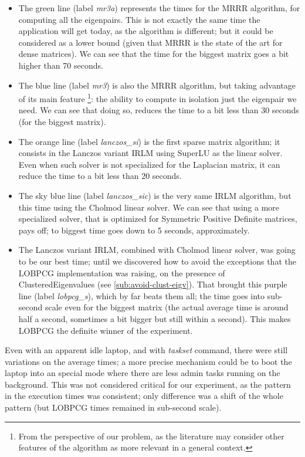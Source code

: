 \begin{itemize}
\item The green line (label \emph{mr3a}) represents the times for the
  \gls{MRRR} algorithm, for 
  computing all the eigenpairs. This is not exactly the same time
  the application will get today, as the algorithm is different; but
  it could be considered as a lower bound (given that \gls{MRRR} is the
  state of the art for dense matrices). We can see that the time for
  the biggest matrix goes a bit higher than 70 seconds.
\item The blue line (label \emph{mr3}) is also the \gls{MRRR} algorithm, but
  taking advantage of its main feature \footnote{From the perspective
    of our problem, as the literature may consider other features of
    the algorithm as more relevant in a general context.}: the
  ability to compute in 
  isolation just the eigenpair we need. We can see that doing so,
  reduces the time to a bit less than 30 seconds (for the biggest
  matrix).
\item The orange line (label \emph{lanczos\_si}) is the first sparse
  matrix algorithm; it consists in the Lanczos variant \gls{IRLM}
  using \gls{SuperLU} 
  as the linear solver. Even when such solver is not specialized for
  the \gls{Laplacian} matrix, it can reduce the time to a bit less than 20
  seconds.
  \item The sky blue line (label \emph{lanczos\_sic}) is the very same
    \gls{IRLM} algorithm, but this time using the \gls{Cholmod} linear solver. We
    can see that using a more specialized solver, that is optimized
    for Symmetric Positive Definite matrices, pays off; to biggest
    time goes down to 5 seconds, approximately.
  \item The Lanczos variant \gls{IRLM}, combined with \gls{Cholmod} linear
    solver, was going to be our best time; until we discovered how to
    avoid the exceptions that the \gls{LOBPCG} implementation was raising, on
    the presence of \gls{ClusteredEigenvalues} (see
    \cref{sub:avoid-clust-eigv}). That brought this purple 
    line (label \emph{lobpcg\_s}), which by far beats them all; the time
    goes into sub-second scale even for the biggest matrix (the actual
    average time is around half a second, sometimes a bit bigger but
    still within a second). This makes \gls{LOBPCG} the definite winner of
    the experiment. 
\end{itemize}

Even with an apparent idle laptop,
  and with \emph{taskset} command, there were still variations on the
  average times; a more precise mechanism could be to boot the laptop
  into an special mode where there are less admin tasks running on the
background. This was not considered critical for our experiment, as
the pattern in the execution times was consistent; only difference was
a shift of the whole pattern (but \gls{LOBPCG} times remained in sub-second
scale). \\ 

